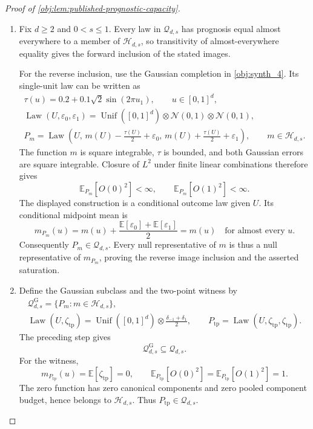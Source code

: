 \begin{proof}[Proof of \cref{obj:lem:published-prognostic-capacity}]
\begin{enumerate}
\item Fix \(d\geq2\) and \(0<s\leq1\). Every law in \(\mathcal Q_{d,s}\) has prognosis equal almost everywhere to a member of \(\mathcal H_{d,s}\), so transitivity of almost-everywhere equality gives the forward inclusion of the stated images.

For the reverse inclusion, use the Gaussian completion in \cref{obj:synth_4}. Its single-unit law can be written as
\[
\begin{gathered}
\tau(u)=0.2+0.1\sqrt2\sin(2\pi u_1),
\qquad u\in[0,1]^d,\\
\operatorname{Law}(U,\varepsilon_0,\varepsilon_1)
=\operatorname{Unif}([0,1]^d)\otimes
\mathcal N(0,1)\otimes\mathcal N(0,1),\\
P_m=\operatorname{Law}\!\left(
U,\,
m(U)-\frac{\tau(U)}2+\varepsilon_0,\,
m(U)+\frac{\tau(U)}2+\varepsilon_1
\right),
\qquad m\in\mathcal H_{d,s}.
\end{gathered}
\]
The function \(m\) is square integrable, \(\tau\) is bounded, and both Gaussian errors are square integrable. Closure of \(L^2\) under finite linear combinations therefore gives
\[
\mathbb E_{P_m}[O(0)^2]<\infty,
\qquad
\mathbb E_{P_m}[O(1)^2]<\infty.
\]
The displayed construction is a conditional outcome law given \(U\). Its conditional midpoint mean is
\[
m_{P_m}(u)
=m(u)+\frac{\mathbb E[\varepsilon_0]+\mathbb E[\varepsilon_1]}2
=m(u)
\quad\text{for almost every }u.
\]
Consequently \(P_m\in\mathcal Q_{d,s}\). Every null representative of \(m\) is thus a null representative of \(m_{P_m}\), proving the reverse image inclusion and the asserted saturation.

\item Define the Gaussian subclass and the two-point witness by
\[
\begin{gathered}
\mathcal Q^{\mathrm G}_{d,s}
=\{P_m:m\in\mathcal H_{d,s}\},\\
\operatorname{Law}(U,\zeta_{\mathrm{tp}})
=\operatorname{Unif}([0,1]^d)\otimes
\frac{\delta_{-1}+\delta_1}{2},
\qquad
P_{\mathrm{tp}}=\operatorname{Law}(U,\zeta_{\mathrm{tp}},\zeta_{\mathrm{tp}}).
\end{gathered}
\]
The preceding step gives
\[
\mathcal Q^{\mathrm G}_{d,s}\subseteq\mathcal Q_{d,s}.
\]
For the witness,
\[
m_{P_{\mathrm{tp}}}(u)=\mathbb E[\zeta_{\mathrm{tp}}]=0,
\qquad
\mathbb E_{P_{\mathrm{tp}}}[O(0)^2]
=\mathbb E_{P_{\mathrm{tp}}}[O(1)^2]=1.
\]
The zero function has zero canonical components and zero pooled component budget, hence belongs to \(\mathcal H_{d,s}\). Thus \(P_{\mathrm{tp}}\in\mathcal Q_{d,s}\).


\end{enumerate}
\end{proof}

